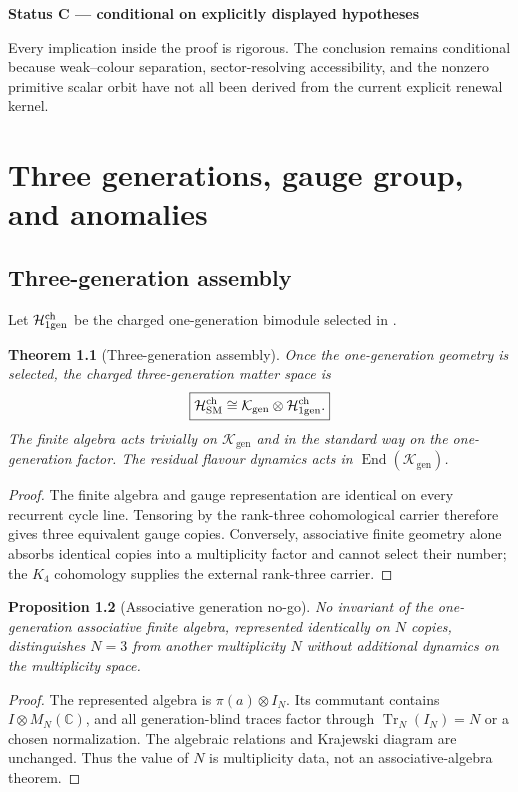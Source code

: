 \documentclass[11pt,oneside,openany]{book}
\numberwithin{equation}{chapter}
\newtheorem{theorem}{Theorem}[chapter]
\newtheorem{proposition}[theorem]{Proposition}
\theoremstyle{definition}
\theoremstyle{remark}
\newcommand{\C}{\mathbb C}
\newcommand{\Tr}{\operatorname{Tr}}
\newcommand{\End}{\operatorname{End}}
\newcommand{\Kgen}{\mathcal K_{\mathrm{gen}}}
\newenvironment{statusbox}[2]{%
  \par\medskip\noindent
  \begin{center}\begin{minipage}{0.94\textwidth}
  \colorbox{#1!8}{\parbox{\dimexpr\linewidth-2\fboxsep\relax}{\textbf{#2}}}\par\smallskip
}{%
  \end{minipage}\end{center}\medskip
}
\newcommand{\Conditional}[1]{\begin{statusbox}{CondColor}{Status C --- conditional on explicitly displayed hypotheses}#1\end{statusbox}}
\begin{document}
\Conditional{Every implication inside the proof is rigorous.  The conclusion remains conditional because weak--colour separation, sector-resolving accessibility, and the nonzero primitive scalar orbit have not all been derived from the current explicit renewal kernel.}

\chapter{Three generations, gauge group, and anomalies}
\label{ch:gauge}

\section{Three-generation assembly}
Let $\mathcal H_{\rm 1gen}^{\rm ch}$ be the charged one-generation bimodule selected in .

\begin{theorem}[Three-generation assembly]
\label{thm:three-generation-assembly}
Once the one-generation geometry is selected, the charged three-generation matter space is
\[
 \boxed{
 \mathcal H_{\rm SM}^{\rm ch}
 \cong
 \Kgen\otimes\mathcal H_{\rm 1gen}^{\rm ch}.
 }
\]
The finite algebra acts trivially on $\Kgen$ and in the standard way on the one-generation factor.  The residual flavour dynamics acts in $\End(\Kgen)$.
\end{theorem}

\begin{proof}
The finite algebra and gauge representation are identical on every recurrent cycle line.  Tensoring by the rank-three cohomological carrier therefore gives three equivalent gauge copies.  Conversely, associative finite geometry alone absorbs identical copies into a multiplicity factor and cannot select their number; the $K_4$ cohomology supplies the external rank-three carrier.
\end{proof}

\begin{proposition}[Associative generation no-go]
\label{prop:assoc-gen-no-go}
No invariant of the one-generation associative finite algebra, represented identically on $N$ copies, distinguishes $N=3$ from another multiplicity $N$ without additional dynamics on the multiplicity space.
\end{proposition}

\begin{proof}
The represented algebra is $\pi(a)\otimes I_N$.  Its commutant contains $I\otimes M_N(\C)$, and all generation-blind traces factor through $\Tr_N(I_N)=N$ or a chosen normalization.  The algebraic relations and Krajewski diagram are unchanged.  Thus the value of $N$ is multiplicity data, not an associative-algebra theorem.
\end{proof}
\end{document}
